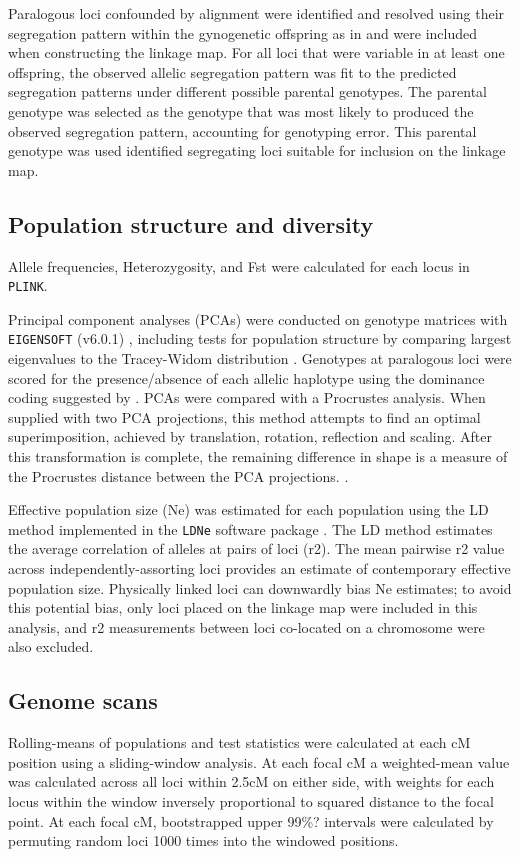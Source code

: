 \documentclass[12pt, one column]{article}
\begin{document}
Paralogous loci confounded by alignment were identified and resolved using their segregation pattern within the gynogenetic offspring as in \citet{Waples2015} and were included when constructing the linkage map. For all loci that were variable in at least one offspring, the observed allelic segregation pattern was fit to the predicted segregation patterns under different possible parental genotypes.  The parental genotype was selected as the genotype that was most likely to produced the observed segregation pattern, accounting for genotyping error. This parental genotype was used identified segregating loci suitable for inclusion on the linkage map. 

\subsection*{Population structure and diversity}

Allele frequencies, Heterozygosity, and Fst \citep{Weir1984} were calculated for each locus in \texttt{PLINK}.

Principal component analyses (PCAs) were conducted on genotype matrices with \texttt{EIGENSOFT} (v6.0.1) \citep{Patterson2006}, including tests for population structure by comparing largest eigenvalues to the Tracey-Widom distribution \citep{Tracy1994}.  Genotypes at paralogous loci were scored for the presence/absence of each allelic haplotype using the dominance coding suggested by \citet{Patterson2006}. PCAs were compared with a Procrustes analysis. When supplied with two PCA projections, this method attempts to find an optimal superimposition, achieved by translation, rotation, reflection and scaling.  After this transformation is complete, the remaining difference in shape is a measure of the Procrustes distance between the PCA projections. \citep{Peres2001}.

Effective population size (Ne) was estimated for each population using the LD method implemented in the \texttt{LDNe} software package \citep{Waples2010}.  The LD method estimates the average correlation of alleles at pairs of loci (r2). The mean pairwise r2 value across independently-assorting loci provides an estimate of contemporary effective population size. Physically linked loci can downwardly bias Ne estimates; to avoid this potential bias, only loci placed on the linkage map were included in this analysis, and r2 measurements between loci co-located on a chromosome were also excluded.

\subsection*{Genome scans}
Rolling-means of populations and test statistics were calculated at each cM position using a sliding-window analysis. At each focal cM a weighted-mean value was calculated across all loci within 2.5cM on either side, with weights for each locus within the window inversely proportional to squared distance to the focal point. At each focal cM, bootstrapped upper 99\%? intervals were calculated by permuting random loci 1000 times into the windowed positions.
\end{document}
